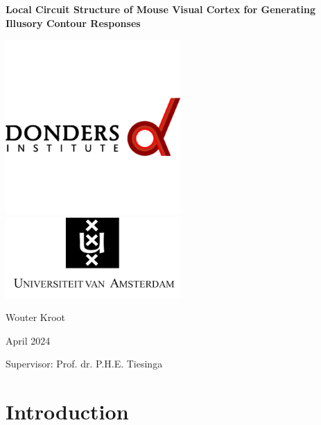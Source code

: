 \documentclass[12pt]{article}
\begin{document}
\begin{titlepage}
\centering

{\LARGE\bfseries Local Circuit Structure of Mouse Visual Cortex for Generating Illusory Contour Responses\par}

\vspace{5pt} %

\includegraphics[width=0.5\textwidth]{figures/donders_logo.png}
\includegraphics[width=0.5\textwidth]{figures/uva_logo.png}


\vspace{20pt} %

{\Large Wouter Kroot\par}
\vspace{5pt} %
{\Large April 2024\par}
\vspace{5pt}
{\Large Supervisor: Prof. dr. P.H.E. Tiesinga}

\end{titlepage}

\newpage

\begin{abstract}
  \lipsum[1]
\end{abstract}

\newpage

\section{Introduction}
\end{document}
